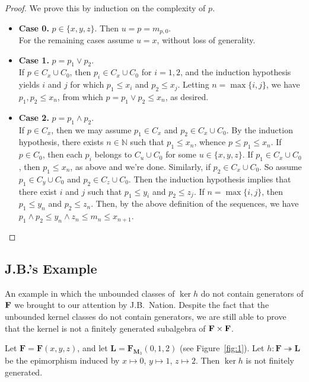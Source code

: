 \begin{proof} We prove this by induction on the complexity of $p$. 

\begin{itemize}
  \item {\bf Case 0.} $p\in \{x, y, z\}$. Then $u = p = m_{p,0}$.\\
  For the remaining cases assume $u = x$, without loss of generality.

  \item {\bf Case 1.} $p = p_1 \vee p_2$.  \\
  If $p \in C_x\cup C_0$, then $p_i \in C_x \cup C_0$ for $i = 1, 2$, and 
  the induction hypothesis yields $i$ and $j$ for which $p_1 \leqslant x_i$ 
  and $p_2 \leqslant x_j$. Letting $n = \max\{i, j\}$, we have 
  $p_1, p_2 \leqslant x_n$, from which $p = p_1 \vee p_2 \leqslant x_n$, as desired.

  \item {\bf Case 2.} $p = p_1 \wedge p_2$.  \\
  If $p \in C_x$, then we may assume $p_1 \in C_x$ and $p_2 \in C_x \cup C_0$. 
  By the induction hypothesis, there exists $n\in \mathbb N$ such that 
  $p_1 \leqslant x_n$, whence $p \leqslant p_1 \leqslant x_n$.
  If $p \in C_0$, then each $p_i$ belongs to $C_u \cup C_0$ for some 
  $u\in \{x, y, z\}$.  If $p_1 \in C_x \cup C_0$, then $p_1 \leqslant x_n$, as 
  above and we're done.  Similarly, if $p_2 \in C_x \cup C_0$.  So assume 
  $p_1 \in C_y \cup C_0$ and $p_2 \in C_z \cup C_0$. Then the induction 
  hypothesis implies that there exist $i$ and $j$ such that 
  $p_1 \leqslant y_i$ and $p_2 \leqslant z_j$. If $n = \max\{i, j\}$, then
  $p_1 \leqslant y_n$ and $p_2 \leqslant z_n$.  Then, by the above definition 
  of the sequences, we have $p_1 \wedge p_2 \leqslant y_n \wedge z_n \leqslant 
  m_n \leqslant x_{n+1}$.
\end{itemize}
\end{proof}



\subsection{J.B.'s Example}
An example in which the unbounded
classes of $\ker h$ do not contain generators of $\mathbf{F}$ we brought to our attention by J.B.~Nation.  Despite the fact that the unbounded kernel classes do not contain generators, we are still able to prove that the kernel is not a finitely generated subalgebra of $\mathbf{F} \times \mathbf{F}$.
\begin{proposition}
  \label{prop:2.2}
Let $\mathbf{F} = \mathbf{F}(x,y,z)$, and let $\mathbf{L} = \mathbf{F}_{\mathbf{M}_3}(0,1,2)$ (see Figure~\ref{fig:1}).  
Let $h\colon \mathbf{F} \twoheadrightarrow \mathbf{L}$ be the epimorphism induced by $x\mapsto 0$, $y\mapsto 1$, $z\mapsto 2$. Then $\operatorname{ker}h$ is not finitely generated.  
\end{proposition}

